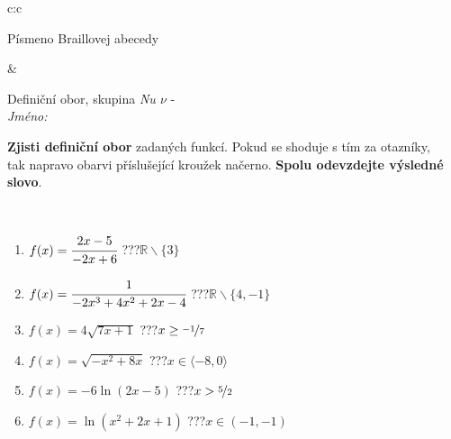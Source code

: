 \documentclass[10pt]{report}
\begin{document}
\begin{tabular}{c:c}
\begin{minipage}[c][104.5mm][t]{0.5\linewidth}
\begin{center}
\begin{minipage}{0.20\linewidth}
\begin{center}
{\small Písmeno Braillovej abecedy}
\end{center}
\end{minipage}
\end{center}
\end{minipage}
&
\begin{minipage}[c][104.5mm][t]{0.5\linewidth}
\begin{center}
\vspace{7mm}
{\huge Definiční obor, skupina \textit{Nu $\nu$} -}\\[5mm]
\textit{Jméno:}\phantom{xxxxxxxxxxxxxxxxxxxxxxxxxxxxxxxxxxxxxxxxxxxxxxxxxxxxxxxxxxxxxxxxx}\\[5mm]
\begin{minipage}{0.95\linewidth}
\begin{center}
\textbf{Zjisti definiční obor} zadaných funkcí. Pokud se shoduje s tím za otazníky,\\tak napravo obarvi příslušející kroužek načerno. \textbf{Spolu odevzdejte výsledné slovo}.
\end{center}
\end{minipage}
\\[1mm]
\begin{minipage}{0.79\linewidth}
\begin{center}
\begin{varwidth}{\linewidth}
\begin{enumerate}
\normalsizerrr
\item $f(x)=\cfrac{2x-5}{-2x+6}$\quad \dotfill\; ???\;\dotfill \quad $\mathbb{R}\smallsetminus\{3\}$
\item $f(x)=\cfrac{1}{-2x^3+4x^2+2x-4}$\quad \dotfill\; ???\;\dotfill \quad $\mathbb{R}\smallsetminus\{4,-1\}$
\item $f(x)=4\sqrt{7x+1}$\quad \dotfill\; ???\;\dotfill \quad $x\geq\nicefrac{-1}{7}$
\item $f(x)=\sqrt{-x^2+8x}$\quad \dotfill\; ???\;\dotfill \quad $x\in\langle-8 , 0\rangle$
\item $f(x)=-6\ln{(2x-5)}$\quad \dotfill\; ???\;\dotfill \quad $x>\nicefrac{5}{2}$
\item $f(x)=\ln{(x^2+2x+1)}$\quad \dotfill\; ???\;\dotfill \quad $x\in(-1 , -1)$
\end{enumerate}
\end{varwidth}
\end{center}
\end{minipage}
\begin{minipage}{0.20\linewidth}
\begin{center}

\end{center}
\end{minipage}
\end{center}
\end{minipage}
\end{tabular}
\end{document}
